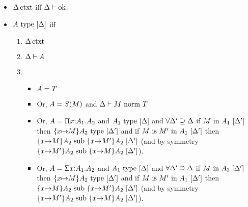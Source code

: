 \documentclass{article}
\theoremstyle{break}
\begin{document}
\begin{itemize}


\item
$\semanticcontext{\world}$ iff
$\validcontext{\world}$.

\item
$\semanticvalidtype{\world}{\kind}$ iff
\begin{enumerate}
\item $\semanticcontext{\world}$
\item $\validkind{\world}{\kind}$
\item
\begin{itemize}{}
\item $\kind = \ktype$
\item Or, $\kind = \ksingleton{\constructor}$ and 
$\normterm{\world}{\constructor}{\ktype}$
\item Or, $\kind = \kpi{\evar}{\kind_1}{\kind_2}$ and
$\semanticvalidtype{\world}{\kind_1}$ and
$\forall \world'\supseteq\world$ if $\semanticvalidterm{\world'}{\constructor}{\kind_1}$
then $\semanticvalidtype{\world'}{\substitute{\cvar}{\constructor}{\kind_2}}$ and
if $\semanticequivterm{\world'}{\constructor}{\constructor'}{\kind_1}$ then
$\semanticsubtype{\world'}{\substitute{\cvar}{\constructor}{\kind_2}}{\substitute{\cvar}{\constructor'}{\kind_2}}$
(and by symmetry
$\semanticsubtype{\world'}{\substitute{\cvar}{\constructor'}{\kind_2}}{\substitute{\cvar}{\constructor}{\kind_2}}$).
\item Or, $\kind = \ksigma{\evar}{\kind_1}{\kind_2}$ and
$\semanticvalidtype{\world}{\kind_1}$ and
$\forall \world'\supseteq\world$ if $\semanticvalidterm{\world'}{\constructor}{\kind_1}$
then $\semanticvalidtype{\world'}{\substitute{\cvar}{\constructor}{\kind_2}}$ and
if $\semanticequivterm{\world'}{\constructor}{\constructor'}{\kind_1}$ then
$\semanticsubtype{\world'}{\substitute{\cvar}{\constructor}{\kind_2}}{\substitute{\cvar}{\constructor'}{\kind_2}}$
(and by symmetry
$\semanticsubtype{\world'}{\substitute{\cvar}{\constructor'}{\kind_2}}{\substitute{\cvar}{\constructor}{\kind_2}}$).
\end{itemize}
\end{enumerate}


\end{itemize}
\end{document}
